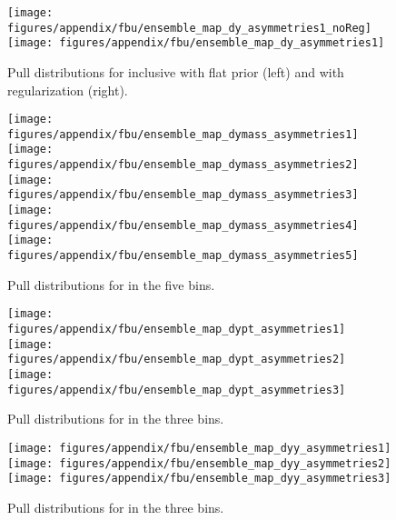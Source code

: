 \begin{figure}
  \begin{center}
  \texttt{[image: figures/appendix/fbu/ensemble\_map\_dy\_asymmetries1\_noReg]}
  \texttt{[image: figures/appendix/fbu/ensemble\_map\_dy\_asymmetries1]}
  \caption{
    \label{fig:app:pulls_inclu}
    Pull distributions for inclusive \ac{} with flat prior (left) and with regularization (right).
  }
  \end{center}
\end{figure}

\begin{figure}
  \begin{center}
  \texttt{[image: figures/appendix/fbu/ensemble\_map\_dymass\_asymmetries1]}
  \texttt{[image: figures/appendix/fbu/ensemble\_map\_dymass\_asymmetries2]}
  \texttt{[image: figures/appendix/fbu/ensemble\_map\_dymass\_asymmetries3]}
  \texttt{[image: figures/appendix/fbu/ensemble\_map\_dymass\_asymmetries4]}
  \texttt{[image: figures/appendix/fbu/ensemble\_map\_dymass\_asymmetries5]}
  \caption{
    \label{fig:app:pulls_vs_mass}
    Pull distributions for \ac{} in the five \mtt{} bins.
  }
  \end{center}
\end{figure}

\begin{figure}
  \begin{center}
  \texttt{[image: figures/appendix/fbu/ensemble\_map\_dypt\_asymmetries1]}
  \texttt{[image: figures/appendix/fbu/ensemble\_map\_dypt\_asymmetries2]}
  \texttt{[image: figures/appendix/fbu/ensemble\_map\_dypt\_asymmetries3]}
  \caption{
    \label{fig:app:pulls_vs_pt}
    Pull distributions for \ac{} in the three \pttt{} bins.
  }
  \end{center}
\end{figure}

\begin{figure}
  \begin{center}
  \texttt{[image: figures/appendix/fbu/ensemble\_map\_dyy\_asymmetries1]}
  \texttt{[image: figures/appendix/fbu/ensemble\_map\_dyy\_asymmetries2]}
  \texttt{[image: figures/appendix/fbu/ensemble\_map\_dyy\_asymmetries3]}
  \caption{
    \label{fig:app:pulls_vs_y}
    Pull distributions for \ac{} in the three \ytt{} bins.
  }
  \end{center}
\end{figure}






